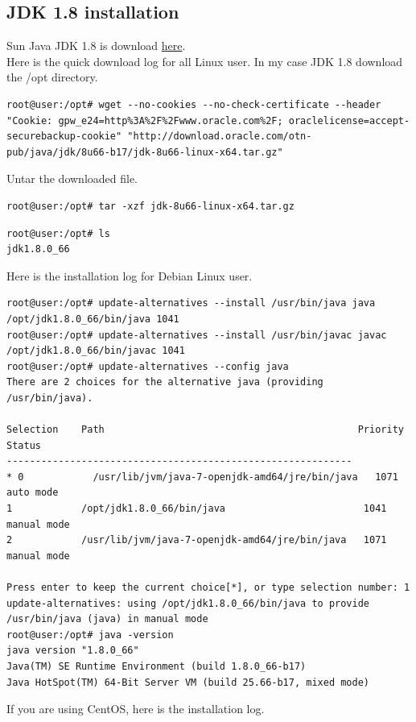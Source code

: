 \documentclass[11pt
  , a4paper
  , article
  , oneside
]{memoir}
\begin{document}
\subsection{JDK 1.8 installation}
Sun Java JDK 1.8 is download \href{http://www.oracle.com/technetwork/java/javase/downloads/jdk8-downloads-2133151.html}{here}.\\
Here is the quick download log for all Linux user. In my case JDK 1.8 download the /opt directory.
\begin{lstlisting}[style=termstyle]
root@user:/opt# wget --no-cookies --no-check-certificate --header "Cookie: gpw_e24=http%3A%2F%2Fwww.oracle.com%2F; oraclelicense=accept-securebackup-cookie" "http://download.oracle.com/otn-pub/java/jdk/8u66-b17/jdk-8u66-linux-x64.tar.gz"
\end{lstlisting}
Untar the downloaded file.
\begin{lstlisting}[style=termstyle]
root@user:/opt# tar -xzf jdk-8u66-linux-x64.tar.gz
\end{lstlisting}
\begin{lstlisting}[style=termstyle]
root@user:/opt# ls
jdk1.8.0_66
\end{lstlisting}
Here is the installation log for Debian Linux user.
\begin{lstlisting}[style=termstyle]
root@user:/opt# update-alternatives --install /usr/bin/java java /opt/jdk1.8.0_66/bin/java 1041
root@user:/opt# update-alternatives --install /usr/bin/javac javac /opt/jdk1.8.0_66/bin/javac 1041
root@user:/opt# update-alternatives --config java
There are 2 choices for the alternative java (providing /usr/bin/java).

Selection    Path                                            Priority   Status
------------------------------------------------------------
* 0            /usr/lib/jvm/java-7-openjdk-amd64/jre/bin/java   1071      auto mode
1            /opt/jdk1.8.0_66/bin/java                        1041      manual mode
2            /usr/lib/jvm/java-7-openjdk-amd64/jre/bin/java   1071      manual mode

Press enter to keep the current choice[*], or type selection number: 1
update-alternatives: using /opt/jdk1.8.0_66/bin/java to provide /usr/bin/java (java) in manual mode
root@user:/opt# java -version
java version "1.8.0_66"
Java(TM) SE Runtime Environment (build 1.8.0_66-b17)
Java HotSpot(TM) 64-Bit Server VM (build 25.66-b17, mixed mode)
\end{lstlisting}
If you are using CentOS, here is the installation log.
\end{document}
